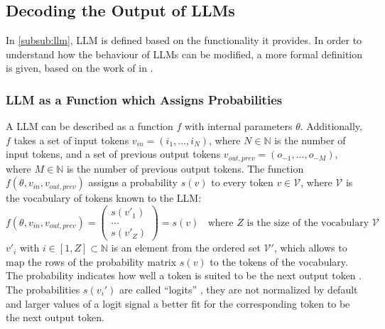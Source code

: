 \documentclass[
	fontsize = 11pt,
	paper = a4,
	draft = false,
	twoside = true,
	titlepage = false
]{scrartcl}
\numberwithin{equation}{subsection}
\begin{document}
	\subsection{Decoding the Output of \gls{LLM}s}
	In \autoref{subsub:llm}, \gls{LLM} is defined based on the functionality it provides. In order to understand how the behaviour of \gls{LLM}s can be modified, a more formal definition is given, based on the work of \citeauthor{llmDetail} in  \autocite{llmDetail}.
	
	\subsubsection{\gls{LLM} as a Function which Assigns Probabilities} \label{subsub:contextWindow}
	A \gls{LLM} can be described as a function $f$ with internal parameters $\theta$. Additionally, $f$ takes a set of input \glspl{token} $v_{in} = (i_1, ..., i_N)$, where $N \in \mathbb{N}$ is the number of input \glspl{token}, and a set of previous output \glspl{token} $v_{out,prev} = (o_{-1}, ..., o_{-M})$, where $M \in \mathbb{N}$ is the number of previous output \glspl{token}. The function $f(\theta, v_{in}, v_{out,prev})$ assigns a probability $s(v)$ to every \gls{token} $v \in \mathcal{V}$, where $\mathcal{V}$ is the vocabulary of \glspl{token} known to the \gls{LLM}:
	\begin{equation}
		f(\theta, v_{in}, v_{out,prev}) = \begin{pmatrix}
			s(v'_1) \\
			... \\
			s(v'_Z)
		\end{pmatrix} = s(v) \ \ \ \ \text{where $Z$ is the size of the vocabulary $\mathcal{V}$} \label{LLM as function}
	\end{equation}
	$v'_i$ with $i \in [1,Z] \subset \mathbb{N}$ is an element from the ordered set $\mathcal{V}'$, which allows to map the rows of the probability matrix $s(v)$ to the \glspl{token} of the vocabulary.
	The probability indicates how well a \gls{token} is suited to be the next output \gls{token} \autocite[p.~4]{llmDetail}. The probabilities $s(v_i')$ are called \enquote{\glspl{logit}} \autocite[p.~4]{llmDetail}, they are not normalized by default and larger values of a \gls{logit} signal a better fit for the corresponding \gls{token} to be the next output \gls{token}. \autocite{llmDetail}
	
\end{document}
